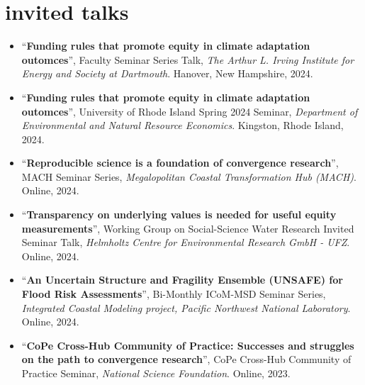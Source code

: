 \documentclass[10pt,oneside]{article}
\begin{document}
\mbox{}\vspace{-\dimexpr\baselineskip\relax}
\vspace*{-1em}
\printbibliography[type=misc, heading=none]


\section{invited talks}

\mbox{}\vspace{-\dimexpr\baselineskip\relax}

\begin{itemize}[label={}]
  
  \item \enquote{\textbf{Funding rules that promote equity in climate adaptation outomces}}, Faculty Seminar Series Talk,  \textit{The Arthur L. Irving Institute for Energy and Society at Dartmouth}. Hanover, New Hampshire, 2024.
  
  \item \enquote{\textbf{Funding rules that promote equity in climate adaptation outomces}}, University of Rhode Island Spring 2024 Seminar,  \textit{Department of Environmental and Natural Resource Economics}. Kingston, Rhode Island, 2024.
  
  \item \enquote{\textbf{Reproducible science is a foundation of convergence research}}, MACH Seminar Series,  \textit{Megalopolitan Coastal Transformation Hub (MACH)}. Online, 2024.
  
  \item \enquote{\textbf{Transparency on underlying values is needed for useful equity measurements}}, Working Group on Social-Science Water Research Invited Seminar Talk,  \textit{Helmholtz Centre for Environmental Research GmbH - UFZ}. Online, 2024.
  
  \item \enquote{\textbf{An Uncertain Structure and Fragility Ensemble (UNSAFE) for Flood Risk Assessments}}, Bi-Monthly ICoM-MSD Seminar Series,  \textit{Integrated Coastal Modeling project, Pacific Northwest National Laboratory}. Online, 2024.
  
  \item \enquote{\textbf{CoPe Cross-Hub Community of Practice: Successes and struggles on the path to convergence research}}, CoPe Cross-Hub Community of Practice Seminar,  \textit{National Science Foundation}. Online, 2023.
  

\end{itemize}
\end{document}
